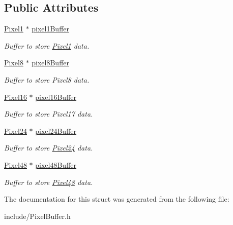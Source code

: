\subsection*{Public Attributes}
\begin{DoxyCompactItemize}
\item 
\mbox{\label{structPixelBuffer_a9b18c48b2a17a9bef627b2db300017ac}} 
\hyperlink{structPixel1}{Pixel1} $\ast$ \hyperlink{structPixelBuffer_a9b18c48b2a17a9bef627b2db300017ac}{pixel1\+Buffer}
\begin{DoxyCompactList}\small\item\em Buffer to store \hyperlink{structPixel1}{Pixel1} data. \end{DoxyCompactList}\item 
\mbox{\label{structPixelBuffer_a15f190f3fba31d11259361fa5905fe2b}} 
\hyperlink{Pixel_8h_a1c7242e36bf21082fbfb88f179f3e2e0}{Pixel8} $\ast$ \hyperlink{structPixelBuffer_a15f190f3fba31d11259361fa5905fe2b}{pixel8\+Buffer}
\begin{DoxyCompactList}\small\item\em Buffer to store Pixel8 data. \end{DoxyCompactList}\item 
\mbox{\label{structPixelBuffer_a392bafb5513649526c4a7d953f097cad}} 
\hyperlink{Pixel_8h_a203ea1ec977221ccab14a5f6004e1c07}{Pixel16} $\ast$ \hyperlink{structPixelBuffer_a392bafb5513649526c4a7d953f097cad}{pixel16\+Buffer}
\begin{DoxyCompactList}\small\item\em Buffer to store Pixel17 data. \end{DoxyCompactList}\item 
\mbox{\label{structPixelBuffer_a2bc8e19daae1d395c487c76e5272b9f5}} 
\hyperlink{structPixel24}{Pixel24} $\ast$ \hyperlink{structPixelBuffer_a2bc8e19daae1d395c487c76e5272b9f5}{pixel24\+Buffer}
\begin{DoxyCompactList}\small\item\em Buffer to store \hyperlink{structPixel24}{Pixel24} data. \end{DoxyCompactList}\item 
\mbox{\label{structPixelBuffer_aa4d7971d945de232c40aefc3bdafeab6}} 
\hyperlink{structPixel48}{Pixel48} $\ast$ \hyperlink{structPixelBuffer_aa4d7971d945de232c40aefc3bdafeab6}{pixel48\+Buffer}
\begin{DoxyCompactList}\small\item\em Buffer to store \hyperlink{structPixel48}{Pixel48} data. \end{DoxyCompactList}\end{DoxyCompactItemize}


The documentation for this struct was generated from the following file\+:\begin{DoxyCompactItemize}
\item 
include/Pixel\+Buffer.\+h\end{DoxyCompactItemize}
